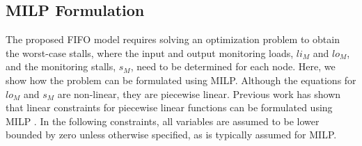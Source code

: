 \subsection{MILP Formulation}
\label{sec:formulation:milp}


The proposed FIFO model requires solving an optimization problem to obtain the
worst-case stalls, where the input and output monitoring loads, $li_{M}$ and $lo_{M}$, 
and the monitoring stalls, $s_{M}$, need to be determined for each node. Here, we show how
the problem can be formulated using MILP. Although the equations 
for $lo_{M}$ and $s_{M}$ are non-linear, they are piecewise linear. Previous work has
shown that linear constraints for piecewise linear functions can be
formulated using MILP \cite{sierksma-lp}. In the
following constraints, all variables are assumed to be lower bounded by zero
unless otherwise specified, as is typically assumed for MILP.

